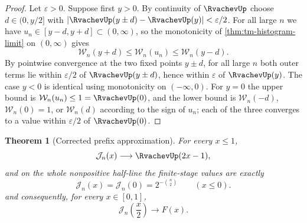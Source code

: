 \documentclass[11pt,oneside]{article}
\newtheorem{theorem}{Theorem}[section]
\theoremstyle{definition}
\theoremstyle{remark}
\begin{document}
\begin{proof}
Let $\varepsilon>0$.  Suppose first $y>0$.  By continuity of $\RvachevUp$ choose
$d\in(0,y/2]$ with $|\RvachevUp(y\pm d)-\RvachevUp(y)|<\varepsilon/2$.  For all large $n$ we have
$u_n\in[y-d,y+d]\subset(0,\infty)$, so the monotonicity of \cref{thm:tm-histogram-limit} on
$(0,\infty)$ gives
\begin{equation*}
 \mathcal W_n(y+d)\le\mathcal W_n(u_n)\le\mathcal W_n(y-d).
\end{equation*}
By pointwise convergence at the two fixed points $y\pm d$, for all large $n$ both outer
terms lie within $\varepsilon/2$ of $\RvachevUp(y\pm d)$, hence within $\varepsilon$ of $\RvachevUp(y)$.
The case $y<0$ is identical using monotonicity on $(-\infty,0)$.  For $y=0$ the upper bound
is $\mathcal W_n(u_n)\le1=\RvachevUp(0)$, and the lower bound is $\mathcal W_n(-d)$, $\mathcal W_n(0)=1$, or
$\mathcal W_n(d)$ according to the sign of $u_n$; each of the three converges to a value within
$\varepsilon/2$ of $\RvachevUp(0)$.
\end{proof}

\begin{theorem}[Corrected prefix approximation]
\label{thm:tm-corrected-convergence}
For every \(x\le1\),
\begin{equation}
 \mathcal J_n(x)\longrightarrow\RvachevUp(2x-1),                      \label{eq:tm-corrected-limit}
\end{equation}
and on the whole nonpositive half-line the finite-stage values are exactly
\begin{equation}
 \mathcal J_n(x)=\mathcal J_n(0)=2^{-\binom n2}\qquad(x\le0).  \label{eq:tm-left-tail-exact}
\end{equation}
and consequently, for every $x\in[0,1]$,
\begin{equation}
 \mathcal J_n\!\left(\frac x2\right)\longrightarrow F(x).      \label{eq:tm-corrected-fabius}
\end{equation}
\end{theorem}
\end{document}
